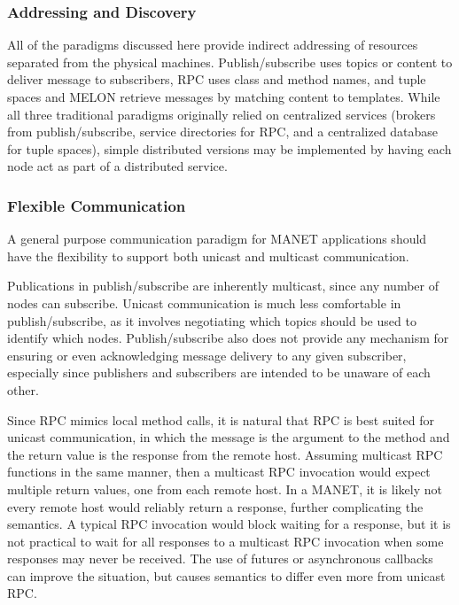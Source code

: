 \documentclass[lnicst]{svmultln}
\begin{document}
\subsubsection{Addressing and Discovery}

All of the paradigms discussed here provide indirect addressing of resources separated from the physical machines. Publish/subscribe uses topics or content to deliver message to subscribers, RPC uses class and method names, and tuple spaces and MELON retrieve messages by matching content to templates. While all three traditional paradigms originally relied on centralized services (brokers from publish/subscribe, service directories for RPC, and a centralized database for tuple spaces), simple distributed versions may be implemented by having each node act as part of a distributed service.
    
\subsubsection{Flexible Communication}

A general purpose communication paradigm for MANET applications should have the flexibility to support both unicast and multicast communication.

Publications in publish/subscribe are inherently multicast, since any number of nodes can subscribe. Unicast communication is much less comfortable in publish/subscribe, as it involves negotiating which topics should be used to identify which nodes. Publish/subscribe also does not provide any mechanism for ensuring or even acknowledging message delivery to any given subscriber, especially since publishers and subscribers are intended to be unaware of each other.

Since RPC mimics local method calls, it is natural that RPC is best suited for unicast communication, in which the message is the argument to the method and the return value is the response from the remote host. Assuming multicast RPC functions in the same manner, then a multicast RPC invocation would expect multiple return values, one from each remote host. In a MANET, it is likely not every remote host would reliably return a response, further complicating the semantics. A typical RPC invocation would block waiting for a response, but it is not practical to wait for all responses to a multicast RPC invocation when some responses may never be received. The use of futures or asynchronous callbacks can improve the situation, but causes semantics to differ even more from unicast RPC.
\end{document}
